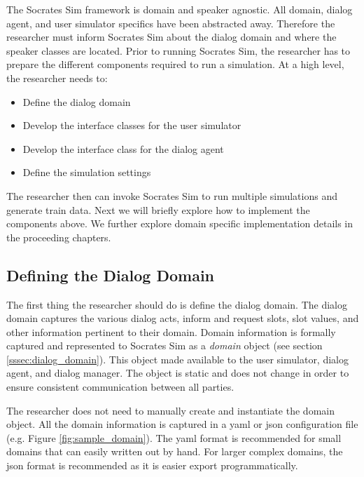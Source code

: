 The Socrates Sim framework is domain and speaker agnostic. All domain, dialog agent, and user simulator specifics have been abstracted away. Therefore the researcher must inform Socrates Sim about the dialog domain and where the speaker classes are located. Prior to running Socrates Sim, the researcher has to prepare the different components required to run a simulation. At a high level, the researcher needs to: 
\begin{itemize}
	\item Define the dialog domain 
	\item Develop the interface classes for the user simulator
	\item Develop the interface class for the dialog agent
	\item Define the simulation settings
\end{itemize}

The researcher then can invoke Socrates Sim to run multiple simulations and generate train data. Next we will briefly explore how to implement the components above. We further explore  domain specific implementation details in the proceeding chapters. 

\subsection{Defining the Dialog Domain}

The first thing the researcher should do is define the dialog domain. The dialog domain captures the various dialog acts, inform and request slots, slot values, and other information pertinent to their domain. Domain information is formally captured and represented to Socrates Sim as a \textit{domain} object (see section \ref{sssec:dialog_domain}). This object made available to the user simulator, dialog agent, and dialog manager. The object is static and does not change in order to ensure consistent communication between all parties. 

The researcher does not need to manually create and instantiate the domain object. All the domain information is captured in a yaml or json configuration file (e.g. Figure \ref{fig:sample_domain}). The yaml format is recommended for small domains that can easily written out by hand. For larger complex domains, the json format is recommended as it is easier export programmatically. 

